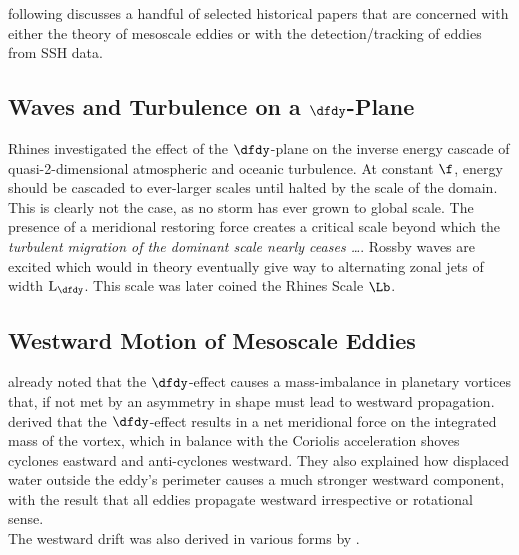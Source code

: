 
  following discusses a handful of selected historical papers that are concerned with either the theory of mesoscale eddies or with the detection/tracking of eddies from SSH data.


\subsection[\Citeauthoryear{Rhines2006}]{\textbf{Waves and Turbulence on a $\dfdy$-Plane} \cite{Rhines2006}}\label{sec:hist_rhines}
Rhines investigated the effect of the $\dfdy$-plane on the inverse energy cascade of quasi-2-dimensional atmospheric and oceanic turbulence. At constant $\f$, energy should be cascaded to ever-larger scales until halted by the scale of the domain. This is clearly not the case, as no storm has ever grown to global scale. The presence of a meridional restoring force creates a critical scale beyond which the \textit{turbulent migration of the dominant scale nearly ceases \ldots}. Rossby waves are excited which would in theory eventually give way to alternating zonal jets of width $\mathrm{L_{\dfdy}}$. This scale was later coined the Rhines Scale $\Lb$.

\subsection[\Citeauthoryear{Cushman-Roisin1990}]{\textbf{Westward Motion of Mesoscale Eddies} \cite{Cushman-Roisin1990}}\label{sec:hist_cush}
\citet{Bjerknes1944} already noted that the $\dfdy$-effect causes a mass-imbalance in planetary vortices that, if not met by an asymmetry in shape must lead to westward propagation. \\
\citet{Nof1981} derived that the $\dfdy$-effect results in a net meridional force on the integrated mass of the vortex, which in balance with the Coriolis acceleration shoves cyclones eastward and anti-cyclones westward. They also explained how displaced water outside the eddy's perimeter causes a much stronger westward component, with the result that all eddies propagate westward irrespective or rotational sense.\\
 The westward drift was also derived in various forms by
\eg \citet{flierl1984rossby,matsuura1982evolution}.

